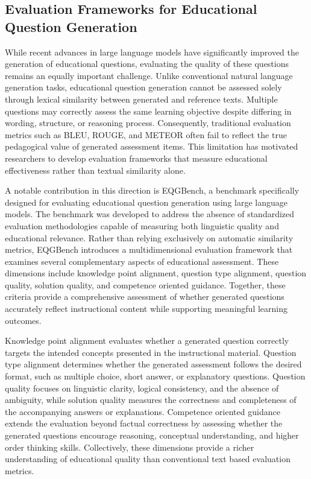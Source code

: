 \subsection{Evaluation Frameworks for Educational Question Generation}
\label{sec:lit-evaluation}

While recent advances in large language models have significantly improved the generation of educational questions, evaluating the quality of these questions remains an equally important challenge. Unlike conventional natural language generation tasks, educational question generation cannot be assessed solely through lexical similarity between generated and reference texts. Multiple questions may correctly assess the same learning objective despite differing in wording, structure, or reasoning process. Consequently, traditional evaluation metrics such as BLEU, ROUGE, and METEOR often fail to reflect the true pedagogical value of generated assessment items. This limitation has motivated researchers to develop evaluation frameworks that measure educational effectiveness rather than textual similarity alone.

A notable contribution in this direction is EQGBench, a benchmark specifically designed for evaluating educational question generation using large language models. The benchmark was developed to address the absence of standardized evaluation methodologies capable of measuring both linguistic quality and educational relevance. Rather than relying exclusively on automatic similarity metrics, EQGBench introduces a multidimensional evaluation framework that examines several complementary aspects of educational assessment. These dimensions include knowledge point alignment, question type alignment, question quality, solution quality, and competence oriented guidance. Together, these criteria provide a comprehensive assessment of whether generated questions accurately reflect instructional content while supporting meaningful learning outcomes. \cite{eqgbench2025}

Knowledge point alignment evaluates whether a generated question correctly targets the intended concepts presented in the instructional material. Question type alignment determines whether the generated assessment follows the desired format, such as multiple choice, short answer, or explanatory questions. Question quality focuses on linguistic clarity, logical consistency, and the absence of ambiguity, while solution quality measures the correctness and completeness of the accompanying answers or explanations. Competence oriented guidance extends the evaluation beyond factual correctness by assessing whether the generated questions encourage reasoning, conceptual understanding, and higher order thinking skills. Collectively, these dimensions provide a richer understanding of educational quality than conventional text based evaluation metrics. \cite{eqgbench2025}

